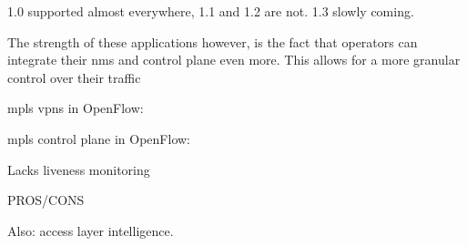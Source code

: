 1.0 supported almost everywhere, 1.1 and 1.2 are not. 1.3 slowly coming.

The strength of these applications however, is the fact that operators can integrate their \ac{nms} and control plane even more. This allows for a more granular control over their traffic

\ac{mpls} \acp{vpn} in OpenFlow: \cite{mpls-vpn-openflow}

\ac{mpls} control plane in OpenFlow: \cite{mpls-open}

Lacks liveness monitoring

PROS/CONS


Also: access layer intelligence.

